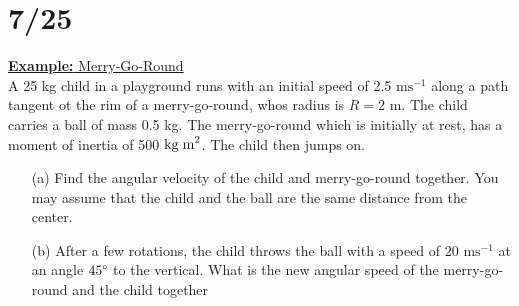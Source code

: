 \documentclass[a4paper]{article}
\let\bf\textbf
\newcommand\ms{\text{ ms}^{-1}}
\newcommand\kgmm{\text{ kg\;m}^{2}}
\begin{document}
\section{7/25}
\begin{shaded}
    \underline{\bf{Example:} Merry-Go-Round}
    \vspace{2mm}\\
    A 25 kg child in a playground runs with an initial speed of 2.5$\ms$ along a path tangent ot the rim of a merry-go-round, whos radius is $R = 2$ m. The child carries a ball of mass 0.5 kg. The merry-go-round which is initially at rest, has a moment of inertia of 500$\kgmm$. The child then jumps on.
    \begin{enumerate}
        \item[(a)] Find the angular velocity of the child and merry-go-round together. You may assume that the child and the ball are the same distance from the center.
        \item[(b)] After a few rotations, the child throws the ball with a speed of 20$\ms$ at an angle $45\degree$ to the vertical. What is the new angular speed of the merry-go-round and the child together
    \end{enumerate}
\end{shaded}
\end{document}
